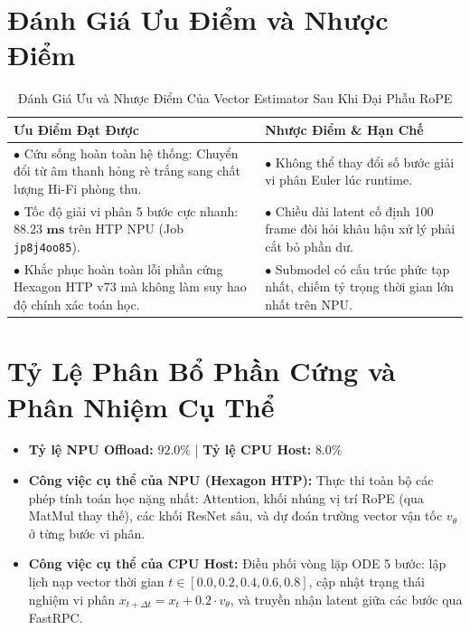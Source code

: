 \documentclass[11pt,a4paper,oneside,table]{report}
\begin{document}
\section{Đánh Giá Ưu Điểm và Nhược Điểm}
\begin{table}[H]
\centering
\small
\sffamily
\caption{Đánh Giá Ưu và Nhược Điểm Của Vector Estimator Sau Khi Đại Phẫu RoPE}
\label{tab:ve_pros_cons}
\vspace{2mm}
\begin{tabularx}{\textwidth}{p{7.5cm} p{7.5cm}}
\toprule
\textbf{Ưu Điểm Đạt Được} & \textbf{Nhược Điểm \& Hạn Chế} \\
\midrule
$\bullet$ Cứu sống hoàn toàn hệ thống: Chuyển đổi từ âm thanh hỏng rè trắng sang chất lượng Hi-Fi phòng thu. & $\bullet$ Không thể thay đổi số bước giải vi phân Euler lúc runtime. \\
\addlinespace
$\bullet$ Tốc độ giải vi phân 5 bước cực nhanh: $\mathbf{88.23\text{ ms}}$ trên HTP NPU (Job \texttt{jp8j4oo85}). & $\bullet$ Chiều dài latent cố định 100 frame đòi hỏi khâu hậu xử lý phải cắt bỏ phần dư. \\
\addlinespace
$\bullet$ Khắc phục hoàn toàn lỗi phần cứng Hexagon HTP v73 mà không làm suy hao độ chính xác toán học. & $\bullet$ Submodel có cấu trúc phức tạp nhất, chiếm tỷ trọng thời gian lớn nhất trên NPU. \\
\bottomrule
\end{tabularx}
\end{table}

\section{Tỷ Lệ Phân Bổ Phần Cứng và Phân Nhiệm Cụ Thể}
\begin{itemize}
    \item \textbf{Tỷ lệ NPU Offload:} $\mathbf{92.0\%}$ | \textbf{Tỷ lệ CPU Host:} $\mathbf{8.0\%}$
    \item \textbf{Công việc cụ thể của NPU (Hexagon HTP):} Thực thi toàn bộ các phép tính toán học nặng nhất: Attention, khối nhúng vị trí RoPE (qua MatMul thay thế), các khối ResNet sâu, và dự đoán trường vector vận tốc $v_\theta$ ở từng bước vi phân.
    \item \textbf{Công việc cụ thể của CPU Host:} Điều phối vòng lặp ODE 5 bước: lập lịch nạp vector thời gian $t \in [0.0, 0.2, 0.4, 0.6, 0.8]$, cập nhật trạng thái nghiệm vi phân $x_{t+\Delta t} = x_t + 0.2 \cdot v_\theta$, và truyền nhận latent giữa các bước qua FastRPC.
\end{itemize}
\end{document}
